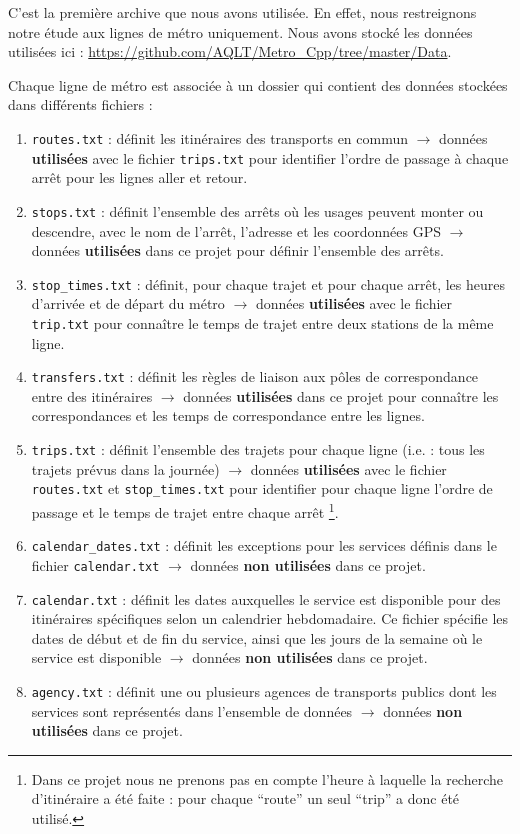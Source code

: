 \documentclass[,french]{article}
\let\rmarkdownfootnote\footnote%
\def\footnote{\protect\rmarkdownfootnote}
\begin{document}
C'est la première archive que nous avons utilisée. En effet, nous
restreignons notre étude aux lignes de métro uniquement. Nous avons
stocké les données utilisées ici :
\url{https://github.com/AQLT/Metro_Cpp/tree/master/Data}.

Chaque ligne de métro est associée à un dossier qui contient des données
stockées dans différents fichiers :

\begin{enumerate}
\def\labelenumi{\arabic{enumi}.}
\item
  \texttt{routes.txt} : définit les itinéraires des transports en commun
  \(\rightarrow\) données \textbf{utilisées} avec le fichier
  \texttt{trips.txt} pour identifier l'ordre de passage à chaque arrêt
  pour les lignes aller et retour.
\item
  \texttt{stops.txt} : définit l'ensemble des arrêts où les usages
  peuvent monter ou descendre, avec le nom de l'arrêt, l'adresse et les
  coordonnées GPS \(\rightarrow\) données \textbf{utilisées} dans ce
  projet pour définir l'ensemble des arrêts.
\item
  \texttt{stop\_times.txt} : définit, pour chaque trajet et pour chaque
  arrêt, les heures d'arrivée et de départ du métro \(\rightarrow\)
  données \textbf{utilisées} avec le fichier \texttt{trip.txt} pour
  connaître le temps de trajet entre deux stations de la même ligne.
\item
  \texttt{transfers.txt} : définit les règles de liaison aux pôles de
  correspondance entre des itinéraires \(\rightarrow\) données
  \textbf{utilisées} dans ce projet pour connaître les correspondances
  et les temps de correspondance entre les lignes.
\item
  \texttt{trips.txt} : définit l'ensemble des trajets pour chaque ligne
  (i.e. : tous les trajets prévus dans la journée) \(\rightarrow\)
  données \textbf{utilisées} avec le fichier \texttt{routes.txt} et
  \texttt{stop\_times.txt} pour identifier pour chaque ligne l'ordre de
  passage et le temps de trajet entre chaque arrêt \footnote{Dans ce
    projet nous ne prenons pas en compte l'heure à laquelle la recherche
    d'itinéraire a été faite : pour chaque ``route'' un seul ``trip'' a
    donc été utilisé.}.
\item
  \texttt{calendar\_dates.txt} : définit les exceptions pour les
  services définis dans le fichier \texttt{calendar.txt} \(\rightarrow\)
  données \textbf{non utilisées} dans ce projet.
\item
  \texttt{calendar.txt} : définit les dates auxquelles le service est
  disponible pour des itinéraires spécifiques selon un calendrier
  hebdomadaire. Ce fichier spécifie les dates de début et de fin du
  service, ainsi que les jours de la semaine où le service est
  disponible \(\rightarrow\) données \textbf{non utilisées} dans ce
  projet.
\item
  \texttt{agency.txt} : définit une ou plusieurs agences de transports
  publics dont les services sont représentés dans l'ensemble de données
  \(\rightarrow\) données \textbf{non utilisées} dans ce projet.
\end{enumerate}
\end{document}
